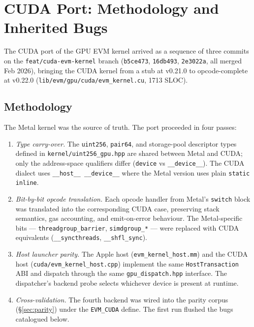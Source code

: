 \section{CUDA Port: Methodology and Inherited Bugs}

\label{sec:cuda}

The CUDA port of the GPU EVM kernel arrived as a sequence of three
commits on the \texttt{feat/cuda-evm-kernel} branch
(\texttt{b5ce473}, \texttt{16db493}, \texttt{2e3022a}, all merged Feb
2026), bringing the CUDA kernel from a stub at v0.21.0 to opcode-complete
at v0.22.0 (\texttt{lib/evm/gpu/cuda/evm\_kernel.cu}, \num{1713} SLOC).

\subsection{Methodology}

The Metal kernel was the source of truth. The port proceeded in four
passes:

\begin{enumerate}
  \item \emph{Type carry-over.} The \texttt{uint256}, \texttt{pair64},
    and storage-pool descriptor types defined in
    \texttt{kernel/uint256\_gpu.hpp} are shared between Metal and CUDA;
    only the address-space qualifiers differ (\texttt{device} vs
    \texttt{\_\_device\_\_}). The CUDA dialect uses
    \texttt{\_\_host\_\_ \_\_device\_\_} where the Metal version uses
    plain \texttt{static inline}.
  \item \emph{Bit-by-bit opcode translation.} Each opcode handler from
    Metal's \texttt{switch} block was translated into the corresponding
    CUDA case, preserving stack semantics, gas accounting, and emit-on-error
    behaviour. The Metal-specific bits --- \texttt{threadgroup\_barrier},
    \texttt{simdgroup\_*} --- were replaced with CUDA equivalents
    (\texttt{\_\_syncthreads}, \texttt{\_\_shfl\_sync}).
  \item \emph{Host launcher parity.} The Apple host
    (\texttt{evm\_kernel\_host.mm}) and the CUDA host
    (\texttt{cuda/evm\_kernel\_host.cpp}) implement the same
    \texttt{HostTransaction} ABI and dispatch through the same
    \texttt{gpu\_dispatch.hpp} interface. The dispatcher's backend probe
    selects whichever device is present at runtime.
  \item \emph{Cross-validation.} The fourth backend was wired into the
    parity corpus (\S\ref{sec:parity}) under the \texttt{EVM\_CUDA}
    define. The first run flushed the bugs catalogued below.
\end{enumerate}

